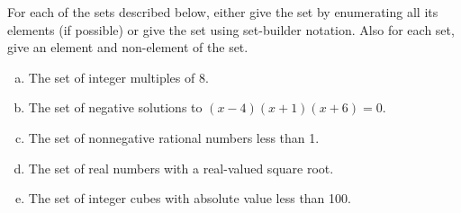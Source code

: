 \documentclass[11pt,letterpaper]{article}
\begin{document}

 For each of the sets described below, either give the set by enumerating all its elements (if possible) or give the set using set-builder notation. Also for each set, give an element and non-element of the set. 
	\begin{enumerate}[(a)]
	\item The set of integer multiples of 8. 
	\item The set of negative solutions to $(x - 4)(x + 1)(x + 6)= 0$.
	\item The set of nonnegative rational numbers less than 1. 
	\item The set of real numbers with a real-valued square root. 
	\item The set of integer cubes with absolute value less than 100.
	\end{enumerate} 
\end{document}
